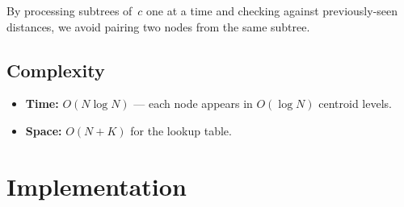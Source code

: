 \documentclass[11pt,a4paper]{article}
\begin{document}
By processing subtrees of~$c$ one at a time and checking against previously-seen distances, we avoid pairing two nodes from the same subtree.

\subsection{Complexity}
\begin{itemize}
    \item \textbf{Time:} $O(N \log N)$ --- each node appears in $O(\log N)$ centroid levels.
    \item \textbf{Space:} $O(N + K)$ for the lookup table.
\end{itemize}

\section{Implementation}
\end{document}
